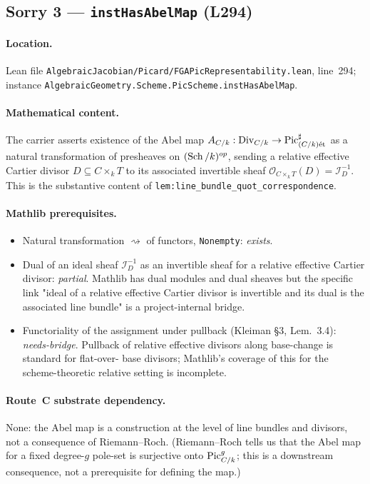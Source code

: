 \subsection{Sorry 3 --- \texttt{instHasAbelMap} (L294)}
\label{subsec:sorry_has_abel_map}

\paragraph{Location.} Lean file
\texttt{AlgebraicJacobian/Picard/FGAPicRepresentability.lean},
line~294; instance
\texttt{AlgebraicGeometry.Scheme.PicScheme.instHasAbelMap}.

\paragraph{Mathematical content.} The carrier asserts existence of
the Abel map
$A_{C/k} : \mathrm{Div}_{C/k} \to \operatorname{Pic}^\sharp_{(C/k)\mathrm{\acute{e}t}}$ as a natural
transformation of presheaves on $(\operatorname{Sch}/k)^{op}$, sending a relative
effective Cartier divisor $D \subseteq C \times_k T$ to its associated
invertible sheaf $\mathcal{O}_{C \times_k T}(D) = \mathcal{I}_D^{-1}$.
This is the substantive content of
\texttt{lem:line_bundle_quot_correspondence}.

\paragraph{Mathlib prerequisites.}
\begin{itemize}
  \item Natural transformation \texttt{${\rightsquigarrow}$} of
    functors, \texttt{Nonempty}: \emph{exists}.
  \item Dual of an ideal sheaf $\mathcal{I}_D^{-1}$ as an invertible
    sheaf for a relative effective Cartier divisor: \emph{partial}.
    Mathlib has dual modules and dual sheaves but the specific link
    "ideal of a relative effective Cartier divisor is invertible and
    its dual is the associated line bundle" is a project-internal
    bridge.
  \item Functoriality of the assignment under pullback (Kleiman \S3,
    Lem.~3.4): \emph{needs-bridge}. Pullback of relative
    effective divisors along base-change is standard for flat-over-
    base divisors; Mathlib's coverage of this for the scheme-theoretic
    relative setting is incomplete.
\end{itemize}

\paragraph{Route~C substrate dependency.} None: the Abel map is a
construction at the level of line bundles and divisors, not a
consequence of Riemann--Roch. (Riemann--Roch tells us that the Abel
map for a fixed degree-$g$ pole-set is surjective onto $\operatorname{Pic}^g_{C/k}$;
this is a downstream consequence, not a prerequisite for defining the
map.)


